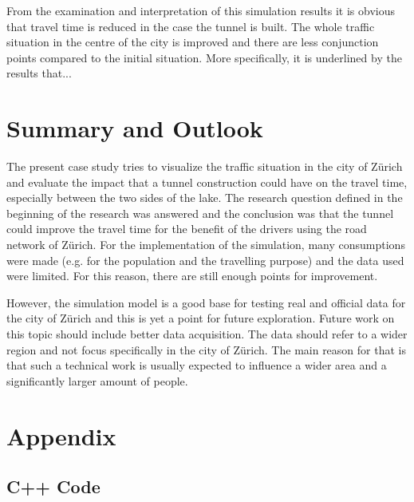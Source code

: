\documentclass[11pt]{article}
\begin{document}
From the examination and interpretation of this simulation results it is obvious that travel time is reduced in the case the tunnel is built. The whole traffic situation in the centre of the city is improved and there are less conjunction points compared to the initial situation. More specifically, it is underlined by the results that...


\section{Summary and Outlook}
The present case study tries to visualize the traffic situation in the city of Z\"urich and evaluate the impact that a tunnel construction could have on the travel time, especially between the two sides of the lake. The research question defined in the beginning of the research was answered and the conclusion was that the tunnel could improve the travel time for the benefit of the drivers using the road network of Z\"urich. For the implementation of the simulation, many consumptions were made (e.g. for the population and the travelling purpose) and the data used were limited. For this reason, there are still enough points for improvement.

However, the simulation model is a good base for testing real and official data for the city of Z\"urich and this is yet a point for future exploration. Future work on this topic should include better data acquisition. The data should refer to a wider region and not focus specifically in the city of Z\"urich. The main reason for that is that such a technical work is usually expected to influence a wider area and a significantly larger amount of people.



\newpage
\printbibliography


\section*{Appendix}

	\subsection*{C++ Code}
\end{document}
